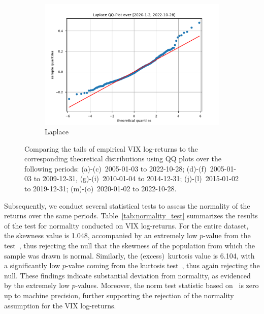 \begin{figure}[htbp]
\begin{subfigure}[b]{0.32\textwidth}
        \includegraphics[width=\textwidth]{content/reschap4/Figures/laplace_QQ_2020-1-2-2022-10-28.pdf}
        \caption{Laplace}
    \end{subfigure}
    \caption{\small Comparing the tails of empirical VIX log-returns to the corresponding theoretical distributions using QQ plots over the following periods: (a)-(c)~{2005-01-03} to {2022-10-28}; (d)-(f)~{2005-01-03} to {2009-12-31}, (g)-(i)~{2010-01-04} to {2014-12-31}; (j)-(l)~{2015-01-02} to {2019-12-31}; (m)-(o)~{2020-01-02} to {2022-10-28}.}\label{fig:QQplots}
\end{figure}

Subsequently, we conduct several statistical tests to assess the normality of the returns over the same periods. Table~\ref{tab:normality_test} summarizes the results of the test for normality conducted on VIX log-returns. For the entire dataset, the skewness value is 1.048, accompanied by an extremely low {$p$\nobreakdash-value} from the test~\cite{DAgostino1990ANormality}, thus rejecting the null that the skewness of the population from which the sample was drawn is normal. Similarly, the (excess)~kurtosis value is 6.104, with a significantly low {$p$\nobreakdash-value} coming from the kurtosis test~\cite{Anscombe1983DistributionSamples}, thus again rejecting the null. These findings indicate substantial deviation from normality, as evidenced by the extremely low {$p$\nobreakdash-values}. Moreover, the norm test statistic based on~\cite{DAgostino1971AnSamples, DAgostino1973Testssqrtb_1} is zero up to machine precision, further supporting the rejection of the normality assumption for the VIX log-returns.

